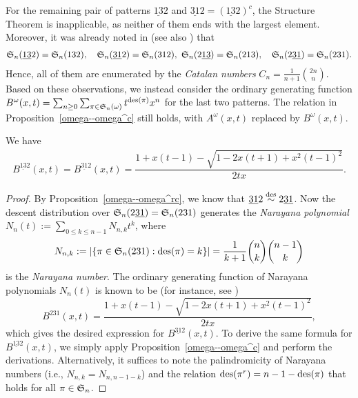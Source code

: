 
For the remaining pair of patterns $\underline{13}2$ and $\underline{31}2 = (\underline{13}2)^c$, the Structure Theorem is inapplicable, as neither of them ends with the largest element. Moreover, it was already noted in \cite[Lem.\ 2]{cla01} (see also \cite[Lem.\ 2.8]{FTHZ19}) that \begin{align*} \S_n(\underline{13}2) = \S_n(132), \quad \S_n(\underline{31}2) = \S_n(312), \ \S_n(2\underline{13}) = \S_n(213), \quad \S_n(2\underline{31}) = \S_n(231). \end{align*} Hence, all of them are enumerated by the {\em Catalan numbers} $C_n = \frac{1}{n+1}\binom{2n}{n}$. Based on these observations, we instead consider the ordinary generating function $B^{\omega}(x,t) = \sum_{n \geq 0} \sum_{\pi \in \S_n(\omega)} t^{\des(\pi)} x^n$ for the last two patterns. The relation in Proposition~\ref{omega--omega^c} still holds, with $A^{\omega}(x,t)$ replaced by $B^{\omega}(x,t)$.

\begin{proposition} \label{13-2}
    We have
    \begin{align*}
    B^{\underline{13}2}(x,t) = B^{\underline{31}2}(x,t)= \dfrac{1+x(t-1)-\sqrt{1-2x(t+1)+x^2(t-1)^2}}{2tx}.
    \end{align*}
\end{proposition}

\begin{proof}
By Proposition~\ref{omega--omega^rc}, we know that $\underline{31}2 \overset{\des}{\sim} 2\underline{31}$. Now the descent distribution over $\S_n(2\underline{31})=\S_n(231)$ generates the {\em Narayana polynomial} $N_n(t):=\sum_{0\le k\le n-1}N_{n,k}t^k$, where
$$N_{n,k}:=|\{\pi\in \S_n(231):\des(\pi)=k\}|=\frac{1}{k+1}\binom{n}{k}\binom{n-1}{k}$$
is the \textit{Narayana number}. The ordinary generating function of Narayana polynomials $N_n(t)$ is known to be (for instance, see \cite[Sect.~2.3]{pet15})
$$B^{231}(x,t)=\dfrac{1+x(t-1)-\sqrt{1-2x(t+1)+x^2(t-1)^2}}{2tx},$$
which gives the desired expression for $B^{\underline{31}2}(x,t)$. To derive the same formula for $B^{\underline{13}2}(x,t)$, we simply apply Proposition~\ref{omega--omega^c} and perform the derivations. Alternatively, it suffices to note the palindromicity of Narayana numbers (i.e., $N_{n,k}=N_{n,n-1-k}$) and the relation $\des(\pi^r)=n-1-\des(\pi)$ that holds for all $\pi\in\S_n$.
\end{proof}




